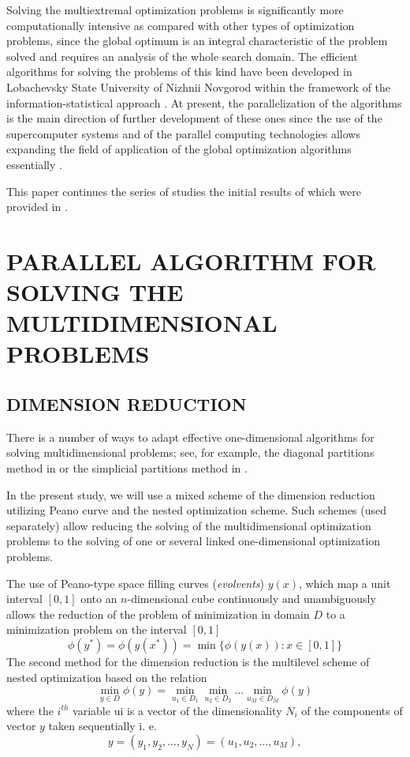 \documentclass{aip-cp}
\begin{document}
Solving the multiextremal optimization problems is significantly more computationally intensive as compared with other types of optimization problems, since the global optimum is an integral characteristic of the problem solved and requires an analysis of the whole search domain. The efficient algorithms for solving the problems of this kind have been developed in Lobachevsky State University of Nizhnii Novgorod within the framework of the information-statistical approach \citep{strongSerg,strongSergLera}. At present, the parallelization of the algorithms is the main direction of further development of these ones since the use of the supercomputer systems and of the parallel computing technologies allows expanding the field of application of the global optimization algorithms essentially \citep{parAlg,parAlg2,gergelLNCS,gergelStrParComputing,mixedAlgLNCS,barkXeon}.

This paper continues the series of studies the initial results of which were provided in \citep{barkGergNestedScheme,localTuning}.

\section{PARALLEL ALGORITHM FOR SOLVING THE MULTIDIMENSIONAL PROBLEMS}

\subsection{DIMENSION REDUCTION}
There is a number of ways to adapt effective one-dimensional algorithms for solving multidimensional problems; see, for example, the diagonal partitions method in \citep{sergKvaDiagNew,kvasovDiag} or the simplicial partitions method in \citep{DISIMPL}. 

In the present study, we will use a mixed scheme of the dimension reduction utilizing Peano curve and the nested optimization scheme. Such schemes (used separately) allow reducing the solving of the multidimensional optimization problems to the solving of one or several linked one-dimensional optimization problems.

The use of Peano-type space filling curves (\textit{evolvents}) $y(x)$, which map a unit interval $[0,1]$ onto an $n$-dimensional cube continuously and unambiguously allows the reduction of the problem of minimization in domain $D$ to a minimization problem on the interval $[0,1]$
\begin{equation}
\label{evolvent}
\phi(y^*)=\phi(y(x^*))=\min\{\phi(y(x)):x\in [0,1]\}
\end{equation}
The second method for the dimension reduction is the multilevel scheme of nested optimization based on the relation
\begin{equation}
\label{nestedScheme}
\min_{y\in D}\phi(y) =\min_{u_1\in D_1}\min_{u_2\in D_2}\dots\min_{u_M\in D_M }\phi(y)
\end{equation}
where the $i^{th}$ variable ui is a vector of the dimensionality $N_i$ of the components of vector $y$ taken sequentially i. e.
\begin{equation}
y=(y_1, y_2, \dots ,y_N)=(u_1,u_2,\dots,u_M),
\end{equation}
\end{document}
